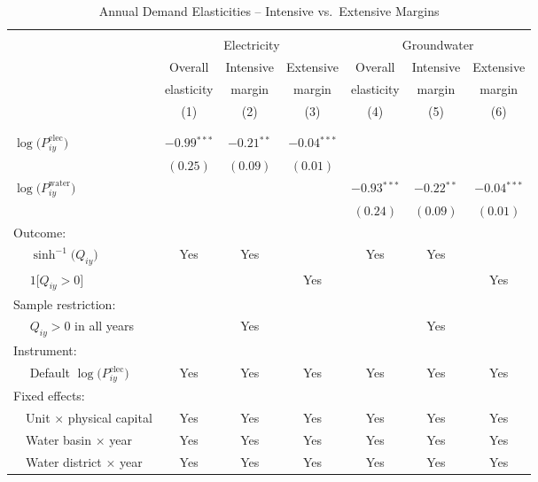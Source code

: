 \begin{table}[t!]\centering
\small
\caption{Annual Demand Elasticities -- Intensive vs.\ Extensive Margins \label{tab:elec_water_intens_extens}}
\vspace{-0.1cm}
\small
\begin{adjustbox}{center} 
\begin{tabular}{lcccccc} 
\hline \hline
\vspace{-0.37cm}
\\
 & \multicolumn{3}{c}{Electricity} & \multicolumn{3}{c}{Groundwater} \\
 \cmidrule(r){2-4} \cmidrule(l){5-7}
 & Overall & Intensive & Extensive & Overall & Intensive & Extensive \\
 & elasticity & margin & margin & elasticity & margin & margin \\
[0.1em]
 & (1)  & (2)  & (3)  & (4)  & (5)  & (6) \\ 
\vspace{-0.37cm}
\\
\cline{2-7}
\vspace{-0.27cm}
\\
 $\log\big(P^{\text{elec}}_{iy}\big)$ ~ & $-0.99$$^{***}$  & $-0.21$$^{**}$ & $-0.04$$^{***}$ &  &  &  \\ 
& $(0.25)$ & $(0.09)$ & $(0.01)$ &  &  &  \\
[0.1em] 
 $\log\big(P^{\text{water}}_{iy}\big)$ ~ &  &  &  & $-0.93$$^{***}$ & $-0.22$$^{**}$  & $-0.04$$^{***}$ \\ 
&  &  &  & $(0.24)$ & $(0.09)$ & $(0.01)$ \\
[1.5em] 
Outcome: \\
~~ $\sinh^{-1}\big(Q_{iy}\big)$ & Yes & Yes & & Yes & Yes & \\
[0.1em] 
~~ $1\big[Q_{iy}>0\big]$ & & & Yes & & & Yes \\
[1.5em] 
Sample restriction: \\
~~ $Q_{iy} > 0$ in all years & & Yes & & & Yes & \\
[1.5em] 
Instrument: \\
[0.1em] 
~~ Default $\log\big(P^{\text{elec}}_{iy}\big)$  & Yes & Yes & Yes  & Yes  & Yes & Yes \\
[1.5em] 
Fixed effects: \\
[0.1em] 
~~Unit $\times$ physical capital & Yes & Yes & Yes & Yes & Yes & Yes  \\
[0.1em] 
~~Water basin $\times$ year & Yes & Yes & Yes & Yes & Yes & Yes \\
[0.1em] 
~~Water district $\times$ year & Yes & Yes & Yes & Yes & Yes & Yes \\

\end{tabular}
\end{adjustbox}
\end{table}
